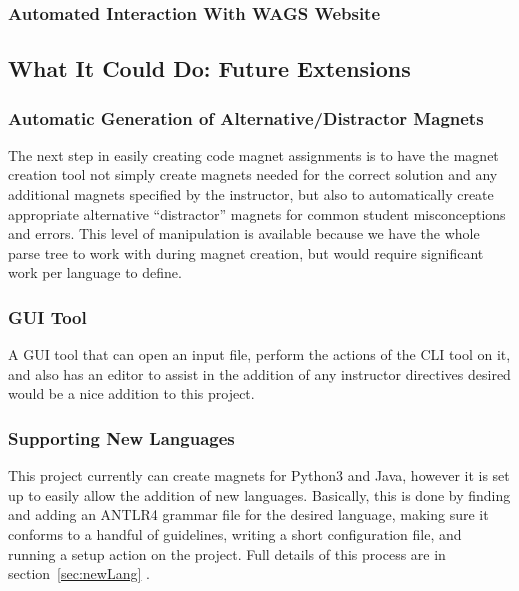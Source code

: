 \documentclass[letter,10pt]{article}
\begin{document}

\subsubsection{Automated Interaction With WAGS Website}


\subsection{What It Could Do: Future Extensions}

\subsubsection{Automatic Generation of Alternative/Distractor Magnets}

The next step in easily creating code magnet assignments is to have the 
magnet creation tool not simply create magnets needed for the correct 
solution and any additional magnets specified by the instructor, but 
also to automatically create appropriate alternative ``distractor'' 
magnets for common student misconceptions and errors. This level of 
manipulation is available because we have the whole parse tree to work 
with during magnet creation, but would require significant work per 
language to define.

\subsubsection{GUI Tool}

A GUI tool that can open an input file, perform the actions of the CLI 
tool on it, and also has an editor to assist in the addition of any 
instructor directives desired would be a nice addition to this project.

\subsubsection{Supporting New Languages}

This project currently can create magnets for Python3 and Java, however 
it is set up to easily allow the addition of new languages. 
Basically, this is done by finding and adding an ANTLR4 grammar file 
for the desired language, making sure it conforms to a handful of 
guidelines, writing a short configuration file, and running a setup 
action on the project. Full details of this process are in 
section~\ref{sec:newLang} .
\end{document}
